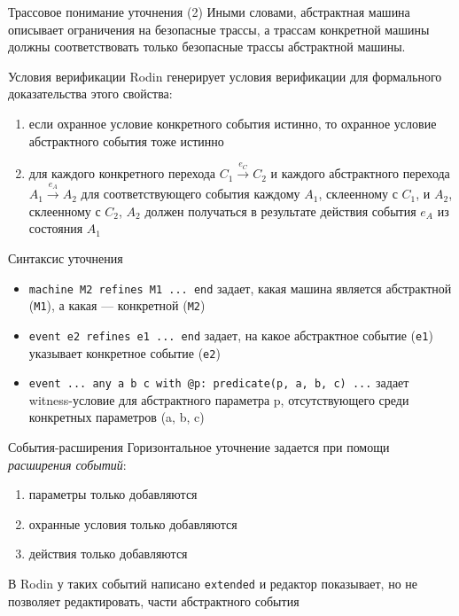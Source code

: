 \documentclass[hyperref={unicode=true}]{beamer}
\begin{document}
    \begin{frame}{Трассовое понимание уточнения (2)}
        Иными словами, абстрактная машина описывает ограничения
        на безопасные трассы, а трассам конкретной машины должны
        соответствовать только безопасные трассы абстрактной машины.
    \end{frame}

    \begin{frame}{Условия верификации}
        Rodin генерирует условия верификации для формального
        доказательства этого свойства:
        \begin{enumerate}
        \item если охранное условие конкретного события истинно,
        то охранное условие абстрактного события тоже истинно
        \item для каждого конкретного перехода
        $C_1 \overset{e_C}{\rightarrow} C_2$ и каждого
        абстрактного перехода $A_1 \overset{e_A}{\rightarrow} A_2$
        для соответствующего события каждому $A_1$, склеенному с $C_1$,
        и $A_2$, склеенному с $C_2$, $A_2$ должен получаться
        в результате действия события $e_A$ из состояния $A_1$
        \end{enumerate}  
    \end{frame}
    
    \begin{frame}[fragile]{Синтаксис уточнения}
        \begin{itemize}
            \item
            \verb`machine M2 refines M1 ... end`
            задает, какая машина является абстрактной (\verb`M1`),
            а какая --- конкретной (\verb`M2`)
            \item
            \verb`event e2 refines e1 ... end`
            задает, на какое абстрактное событие (\verb`e1`)
            указывает конкретное событие (\verb`e2`)
            \item
            \verb`event ... any a b c with @p: predicate(p, a, b, c) ...`
            задает witness-условие для абстрактного параметра p,
            отсутствующего среди конкретных параметров (a, b, c)
        \end{itemize}
    \end{frame}

    \begin{frame}{События-расширения}
        Горизонтальное уточнение задается при помощи
          \emph{расширения событий}:
            \begin{enumerate}
            \item параметры только добавляются
            \item охранные условия только добавляются
            \item действия только добавляются
            \end{enumerate}

        В Rodin у таких событий написано \texttt{extended}
        и редактор показывает, но не позволяет редактировать,
        части абстрактного события
    \end{frame}
\end{document}
